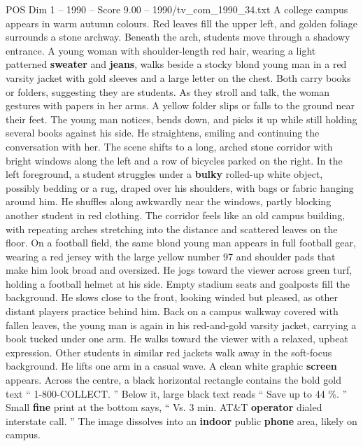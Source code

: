 \begin{textsample}{POS Dim 1 – 1990 – Score 9.00 – 1990/tv\_com\_1990\_34.txt}  \label{ex:f1_pos_045}
A college campus appears in warm autumn colours.
Red leaves fill the upper left, and golden foliage surrounds a stone archway.
Beneath the arch, students move through a shadowy entrance.
A young woman with shoulder-length red hair, wearing a light patterned \textbf{sweater} and \textbf{jeans}, walks beside a stocky blond young man in a red varsity jacket with gold sleeves and a large letter on the chest.
Both carry books or folders, suggesting they are students.
As they stroll and talk, the woman gestures with papers in her arms.
A yellow folder slips or falls to the ground near their feet.
The young man notices, bends down, and picks it up while still holding several books against his side.
He straightens, smiling and continuing the conversation with her.
The scene shifts to a long, arched stone corridor with bright windows along the left and a row of bicycles parked on the right.
In the left foreground, a student struggles under a \textbf{bulky} rolled-up white object, possibly bedding or a rug, draped over his shoulders, with bags or fabric hanging around him.
He shuffles along awkwardly near the windows, partly blocking another student in red clothing.
The corridor feels like an old campus building, with repeating arches stretching into the distance and scattered leaves on the floor.
On a football field, the same blond young man appears in full football gear, wearing a red jersey with the large yellow number 97 and shoulder pads that make him look broad and oversized.
He jogs toward the viewer across green turf, holding a football helmet at his side.
Empty stadium seats and goalposts fill the background.
He slows close to the front, looking winded but pleased, as other distant players practice behind him.
Back on a campus walkway covered with fallen leaves, the young man is again in his red-and-gold varsity jacket, carrying a book tucked under one arm.
He walks toward the viewer with a relaxed, upbeat expression.
Other students in similar red jackets walk away in the soft-focus background.
He lifts one arm in a casual wave.
A clean white graphic \textbf{screen} appears.
Across the centre, a black horizontal rectangle contains the bold gold text “ 1-800-COLLECT. ” Below it, large black text reads “ Save up to 44 \%. ” Small \textbf{fine} print at the bottom says, “ Vs. 3 min.
AT\&T \textbf{operator} dialed interstate call. ” The image dissolves into an \textbf{indoor} public \textbf{phone} area, likely on campus.

\end{textsample}
